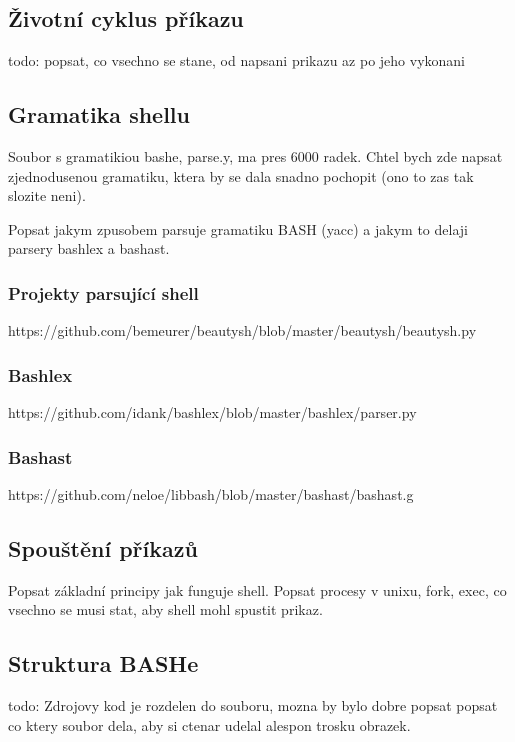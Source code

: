 \documentclass[thesis=M,czech]{FITthesis}[2012/06/26]
\begin{document}
\subsection{Životní cyklus příkazu}

todo: popsat, co vsechno se stane, od napsani prikazu az po jeho vykonani

\subsection{Gramatika shellu}
Soubor s gramatikiou bashe, parse.y, ma pres 6000 radek. Chtel bych zde napsat zjednodusenou gramatiku, ktera by se dala snadno pochopit (ono to zas tak slozite neni).

Popsat jakym zpusobem parsuje gramatiku BASH (yacc) a jakym to delaji parsery bashlex a bashast.



\subsubsection{Projekty parsující shell}
https://github.com/bemeurer/beautysh/blob/master/beautysh/beautysh.py

\subsubsection{Bashlex}
https://github.com/idank/bashlex/blob/master/bashlex/parser.py

\subsubsection{Bashast}
https://github.com/neloe/libbash/blob/master/bashast/bashast.g




\subsection{Spouštění příkazů}
Popsat základní principy jak funguje shell. Popsat procesy v unixu, fork, exec, co vsechno se musi stat, aby shell mohl spustit prikaz.

\subsection{Struktura BASHe}
todo: Zdrojovy kod je rozdelen do souboru, mozna by bylo dobre popsat popsat co ktery soubor dela, aby si ctenar udelal alespon trosku obrazek.
\end{document}
